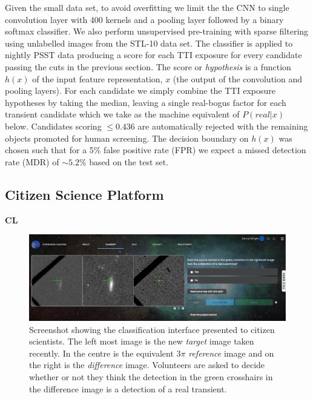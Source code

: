 \documentclass[a4paper,fleqn,usenatbib]{mnras}
\begin{document}
Given the small data set, to avoid overfitting we limit the the CNN to single convolution layer with 400 kernels and a pooling layer followed by a binary softmax classifier.  We also perform unsupervised pre-training with sparse filtering \citet{Ngiam11} using unlabelled images from the STL-10 \citep{Coates11} data set.  The classifier is applied to nightly PSST data producing a score for each TTI exposure for every candidate passing the cuts in the previous section.  The score or \textit{hypothesis} is a function $h(x)$ of the input feature representation, $x$ (the output of the convolution and pooling layers).  For each candidate we simply combine the TTI exposure hypotheses by taking the median, leaving a single real-bogus factor for each transient candidate which we take as the machine equivalent of $P(real|x)$ below.  Candidates scoring $\leq 0.436$ are automatically rejected with the remaining objects promoted for human screening.  The decision boundary on $h(x)$ was chosen such that for a 5\% false positive rate (FPR) we expect a missed detection rate (MDR) of $\sim5.2$\% based on
the test set.

\subsection{Citizen Science Platform}

\textbf{CL}


\begin{figure}
   \begin{minipage}{140mm}
   \includegraphics[width=140mm]{figs/sn_hunters.png}
   \caption{Screenshot showing the classification interface presented to citizen scientists.  The left most image is the new \textit{target} image taken recently.  In the centre is the equivalent $3\pi$ \textit{reference} image and on the right is the \textit{difference} image.  Volunteers are asked to decide whether or not they think the detection in the green crosshairs in the difference image is a
detection of a real transient.} 
   \label{fig:sn_hunters}
   \end{minipage}
\end{figure}
\end{document}
